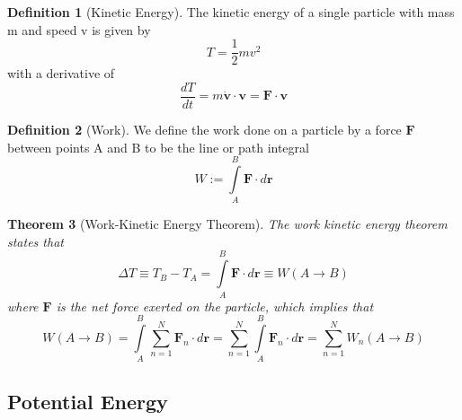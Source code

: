 \documentclass[12pt]{article}
\newtheorem{thm}{Theorem}[section]
\theoremstyle{definition}
\newtheorem{defn}[thm]{Definition}
\theoremstyle{remark}
\numberwithin{equation}{section}
\newcommand\B[1]{\textbf{#1}}
\begin{document}
\begin{defn}[Kinetic Energy]
        The kinetic energy of a single particle with mass m and speed v is given by \begin{equation}
                T = \frac{1}{2}mv^2
        \end{equation}
        with a derivative of \begin{equation}
                \frac{dT}{dt} = m\dot{\B{v}}\cdot\B{v} = \B{F}\cdot\B{v}
        \end{equation}
\end{defn}

\vspace{15pt}

\begin{defn}[Work]
        We define the work done on a particle by a force $\B{F}$ between points A and B to be the line or path integral\begin{equation}
                W := \int\limits_{A}^B\B{F}\cdot d\B{r}
        \end{equation}
\end{defn}

\vspace{15pt}

\begin{thm}[Work-Kinetic Energy Theorem]
        The work kinetic energy theorem states that \begin{equation}
                \Delta T \equiv T_B - T_A = \int\limits_A^B\B{F}\cdot d\B{r} \equiv W(A\rightarrow B)
        \end{equation}
        where $\B{F}$ is the net force exerted on the particle, which implies that \begin{equation}
                W(A\rightarrow B) = \int\limits_A^B\sum\limits_{n=1}^N\B{F}_n\cdot d\B{r} = \sum\limits_{n=1}^N\int\limits_A^B\B{F}_n\cdot d\B{r} = \sum\limits_{n=1}^NW_n(A\rightarrow B)
        \end{equation}
\end{thm}


\vspace{15pt}

\subsection{Potential Energy}
\end{document}
